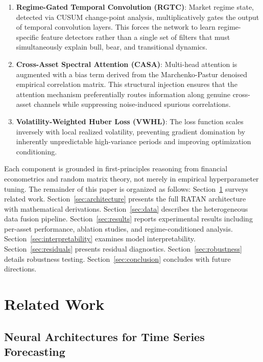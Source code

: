 \documentclass[conference]{IEEEtran}
\begin{document}
\begin{enumerate}[leftmargin=*, itemsep=6pt, topsep=4pt]
    \item \textbf{Regime-Gated Temporal Convolution (RGTC)}: Market regime state, detected via CUSUM change-point analysis, multiplicatively gates the output of temporal convolution layers. This forces the network to learn regime-specific feature detectors rather than a single set of filters that must simultaneously explain bull, bear, and transitional dynamics.
    \item \textbf{Cross-Asset Spectral Attention (CASA)}: Multi-head attention is augmented with a bias term derived from the Marchenko-Pastur denoised empirical correlation matrix. This structural injection ensures that the attention mechanism preferentially routes information along genuine cross-asset channels while suppressing noise-induced spurious correlations.
    \item \textbf{Volatility-Weighted Huber Loss (VWHL)}: The loss function scales inversely with local realized volatility, preventing gradient domination by inherently unpredictable high-variance periods and improving optimization conditioning.
\end{enumerate}

Each component is grounded in first-principles reasoning from financial econometrics and random matrix theory, not merely in empirical hyperparameter tuning. The remainder of this paper is organized as follows: Section~\ref{sec:related} surveys related work. Section~\ref{sec:architecture} presents the full RATAN architecture with mathematical derivations. Section~\ref{sec:data} describes the heterogeneous data fusion pipeline. Section~\ref{sec:results} reports experimental results including per-asset performance, ablation studies, and regime-conditioned analysis. Section~\ref{sec:interpretability} examines model interpretability. Section~\ref{sec:residuals} presents residual diagnostics. Section~\ref{sec:robustness} details robustness testing. Section~\ref{sec:conclusion} concludes with future directions.

\section{Related Work}
\label{sec:related}

\subsection{Neural Architectures for Time Series Forecasting}
\end{document}
